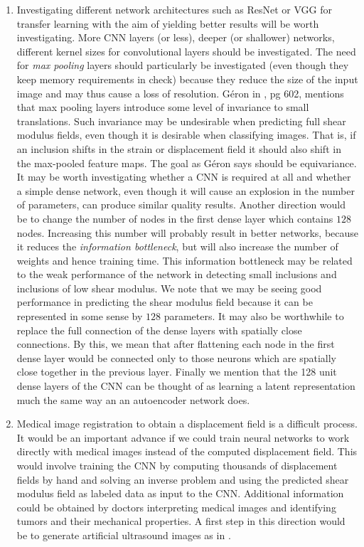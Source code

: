 \documentclass[12pt]{article}
\begin{document}
\begin{enumerate}
\item{Investigating different network architectures such as ResNet \cite{conf:resnet} or VGG \cite{conf:vgg} for transfer learning with the aim of yielding better results will be worth investigating. More CNN layers (or less), deeper (or shallower) networks, different kernel sizes for convolutional layers should be investigated. The need for \textit{max pooling} layers should particularly be investigated (even though they keep memory requirements in check) because they reduce the size of the input image and may thus cause a loss of resolution. G\'{e}ron in \cite{book:geron2019}, pg 602, mentions that max pooling layers introduce some level of invariance to small translations. Such invariance may be undesirable when predicting full shear modulus fields, even though it is desirable when classifying images. That is, if an inclusion shifts in the strain or displacement field it should also shift in the max-pooled feature maps. The goal as G\'{e}ron says should be equivariance. It may be worth investigating whether a CNN is required at all and whether a simple dense network, even though it will cause an explosion in the number of parameters, can produce similar quality results. Another direction would be to change the number of nodes in the first dense layer which contains $128$ nodes. Increasing this number will probably result in better networks, because it reduces the \textit{information bottleneck}\cite{book:chollet}, but will also increase the number of weights and hence training time. This information bottleneck may be related to the weak performance of the network in detecting small inclusions and inclusions of low shear modulus. We note that we may be seeing good performance in predicting the shear modulus field because it can be represented in some sense by $128$ parameters. It may also be worthwhile to replace the full connection of the dense layers with spatially close connections. By this, we mean that after flattening each node in the first dense layer would be connected only to those neurons which are spatially close together in the previous layer. Finally we mention that the 128 unit dense layers of the CNN can be thought of as learning a latent representation much the same way an an autoencoder network does.}
\item{Medical image registration to obtain a displacement field is a difficult process. It would be an important advance if we could train neural networks to work directly with medical images instead of the computed displacement field. This would involve training the CNN by computing thousands of displacement fields by hand and solving an inverse problem and using the predicted shear modulus field as labeled data as input to the CNN. Additional information could be obtained by doctors interpreting medical images and identifying tumors and their mechanical properties. A first step in this direction would be to generate artificial ultrasound images as in \cite{paper:doyley}.}

\end{enumerate}
\end{document}
